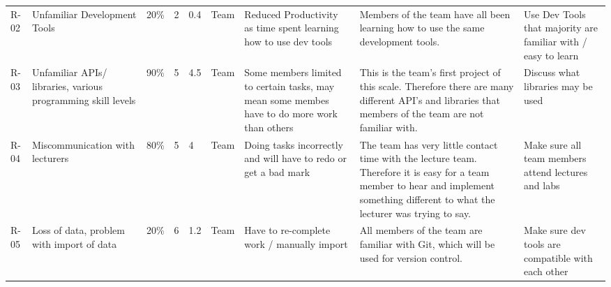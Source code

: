 \begin{tabular}{lllllllll}
R-02 & Unfamiliar Development Tools                                               & 20\%                                                           & 2                                                        & 0.4                                                          & Team                & Reduced Productivity as time spent learning how to use dev tools                             & Members of the team have all been learning how to use the same development tools.                                                                                                                                                                                      & Use Dev Tools that majority are familiar with / easy to learn                                    \\
R-03 & Unfamiliar APIs/ libraries, various programming skill levels               & 90\%                                                           & 5                                                        & 4.5                                                          & Team                & Some members limited to certain tasks, may mean some membes have to do more work than others & This is the team's first project of this scale. Therefore there are many different API’s and libraries that members of the team are not familiar with.                                                                                                                 & Discuss what libraries may be used                                                               \\
R-04 & Miscommunication with lecturers                                            & 80\%                                                           & 5                                                        & 4                                                            & Team                & Doing tasks incorrectly and will have to redo or get a bad mark                              & The team has very little contact time with the lecture team. Therefore it is easy for a team member to hear and implement something different to what the lecturer was trying to say.                                                                                  & Make sure all team members attend lectures and labs                                              \\
R-05 & Loss of data, problem with import of data                                  & 20\%                                                           & 6                                                        & 1.2                                                          & Team                & Have to re-complete work / manually import                                                   & All members of the team are familiar with Git, which will be used for version control.                                                                                                                                                                                 & Make sure dev tools are compatible with each other                                               \\

\end{tabular}
